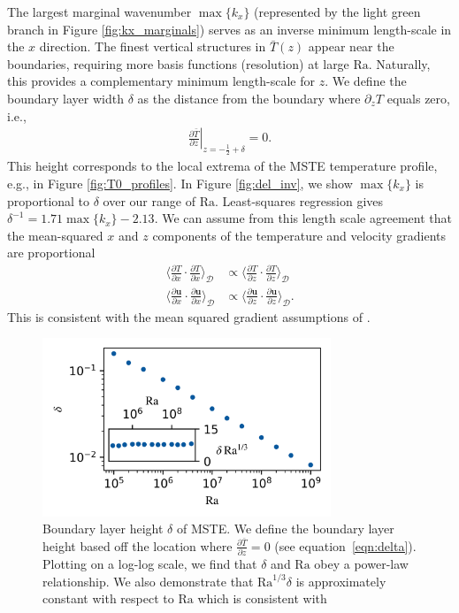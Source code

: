 \documentclass[reprint,amsmath,amssymb,aps]{revtex4-1}
\newcommand\Ra{\mathrm{Ra}}
\renewcommand{\vec}[1]{\boldsymbol{#1}}
\begin{document}
The largest marginal wavenumber $\max \{ k_x \}$ (represented by the light green branch in Figure \ref{fig:kx_marginals}) serves as an inverse minimum length-scale in the $x$ direction.
The finest vertical structures in $\bar{T}(z)$ appear near the boundaries, requiring more basis functions (resolution) at large $\Ra$.
Naturally, this provides a complementary minimum length-scale for $z$.
We define the boundary layer width $\delta$ as the distance from the boundary where $\partial_z T$ equals zero, i.e.,
\begin{align}\label{eqn:delta}
\left.\frac{\partial \bar{T}}{\partial z}\right|_{z=-\frac{1}{2}+\delta} = 0.
\end{align}
This height corresponds to the local extrema of the MSTE temperature profile, e.g., in Figure \ref{fig:T0_profiles}.
In Figure \ref{fig:del_inv}, we show $\max \{ k_x\}$ is proportional to $\delta$ over our range of $\Ra$.
Least-squares regression gives $\delta^{-1} = 1.71 \max \{ k_x \} - 2.13$.
We can assume from this length scale agreement that the mean-squared $x$ and $z$ components of the temperature and velocity gradients are proportional
\begin{align}
    \Big\langle \frac{\partial T}{\partial x} \cdot \frac{\partial T}{\partial x} \Big\rangle_{\mathcal{D}} &\propto \Big\langle \frac{\partial T}{\partial z} \cdot \frac{\partial T}{\partial z} \Big\rangle_{\mathcal{D}} \nonumber   \\
    \Big\langle \frac{\partial \vec{u}}{\partial x} \cdot \frac{\partial \vec{u}}{\partial x} \Big\rangle_{\mathcal{D}} &\propto \Big\langle \frac{\partial \vec{u}}{\partial z} \cdot \frac{\partial \vec{u}}{\partial z} \Big\rangle_{\mathcal{D}}.
\end{align}
This is consistent with the mean squared gradient assumptions of \cite{Malkus_1954}.

\begin{figure}
    \centering
    \includegraphics[width=3.4in]{del_ra.PNG}
    \caption{Boundary layer height $\delta$ of MSTE. 
    We define the boundary layer height based off the location where $\frac{\partial \bar{T}}{\partial z} = 0$ (see equation~\ref{eqn:delta}). 
    Plotting on a log-log scale, we find that $\delta$ and $\Ra$ obey a power-law relationship. We also demonstrate that $\Ra^{1/3}\delta$ is approximately constant with respect to $\Ra$ which is consistent with \cite{Malkus_1954}}
    \label{fig:bl_ra}
\end{figure}
\end{document}
